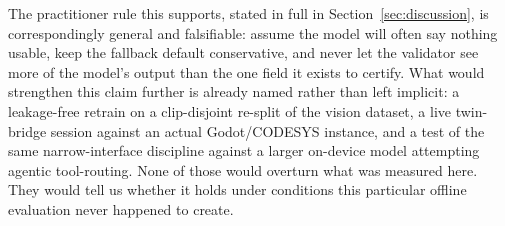 The practitioner rule this supports, stated in full in Section~\ref{sec:discussion}, is
correspondingly general and falsifiable: assume the model will often say nothing usable, keep the
fallback default conservative, and never let the validator see more of the model's output than the
one field it exists to certify. What would strengthen this claim further is already named rather
than left implicit: a leakage-free retrain on
a clip-disjoint re-split of the vision dataset, a live twin-bridge session against an actual
Godot/CODESYS instance, and a test of the same narrow-interface discipline against a larger
on-device model attempting agentic tool-routing. None of those would overturn what was measured
here. They would tell us whether it holds under conditions this particular offline evaluation never
happened to create.
